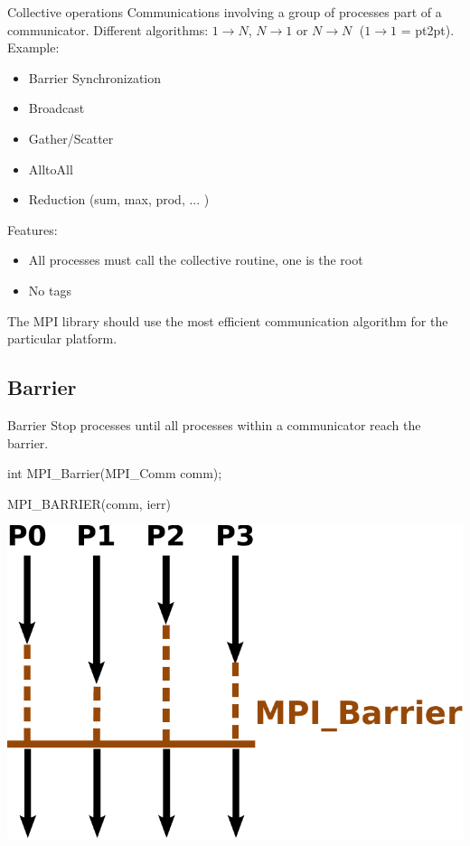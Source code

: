 \documentclass[aspectratio=43]{beamer}
\begin{document}
\begin{frame}{Collective operations}
Communications involving a group of processes part of a communicator.
Different algorithms: $1\rightarrow N$, $N\rightarrow 1$ or $N\rightarrow N\;$ ($1\rightarrow 1$ = pt2pt).\\

Example:
\begin{itemize}
\item Barrier Synchronization
\item Broadcast
\item Gather/Scatter
\item AlltoAll
\item Reduction (sum, max, prod, ... )
\end{itemize}

Features:
\begin{itemize}
    \item All processes must call the collective routine, one is the root
    \item No tags
\end{itemize}

The MPI library should use the most efficient communication algorithm for the particular platform.
\end{frame}


\subsection{Barrier}

\begin{frame}[fragile]{Barrier}
Stop processes until all processes within a communicator reach the barrier.\\
\begin{Cpplisting}[]{}
int MPI_Barrier(MPI_Comm comm);
\end{Cpplisting}
\begin{Fortranlisting}[]{}
MPI_BARRIER(comm, ierr)
\end{Fortranlisting}
\begin{center}
\includegraphics[scale=0.5]{03.MPI_Coll/barrier.pdf}
\end{center}
\end{frame}
\end{document}
